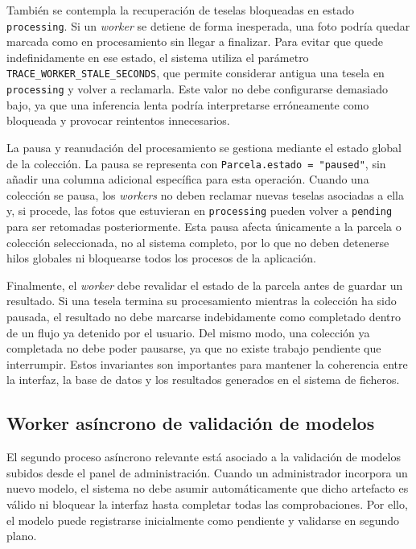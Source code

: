 También se contempla la recuperación de teselas bloqueadas en estado \texttt{processing}. Si un \textit{worker} se detiene de forma inesperada, una foto podría quedar marcada como en procesamiento sin llegar a finalizar. Para evitar que quede indefinidamente en ese estado, el sistema utiliza el parámetro \texttt{TRACE\_WORKER\_STALE\_SECONDS}, que permite considerar antigua una tesela en \texttt{processing} y volver a reclamarla. Este valor no debe configurarse demasiado bajo, ya que una inferencia lenta podría interpretarse erróneamente como bloqueada y provocar reintentos innecesarios.

La pausa y reanudación del procesamiento se gestiona mediante el estado global de la colección. La pausa se representa con \texttt{Parcela.estado = "paused"}, sin añadir una columna adicional específica para esta operación. Cuando una colección se pausa, los \textit{workers} no deben reclamar nuevas teselas asociadas a ella y, si procede, las fotos que estuvieran en \texttt{processing} pueden volver a \texttt{pending} para ser retomadas posteriormente. Esta pausa afecta únicamente a la parcela o colección seleccionada, no al sistema completo, por lo que no deben detenerse hilos globales ni bloquearse todos los procesos de la aplicación.

Finalmente, el \textit{worker} debe revalidar el estado de la parcela antes de guardar un resultado. Si una tesela termina su procesamiento mientras la colección ha sido pausada, el resultado no debe marcarse indebidamente como completado dentro de un flujo ya detenido por el usuario. Del mismo modo, una colección ya completada no debe poder pausarse, ya que no existe trabajo pendiente que interrumpir. Estos invariantes son importantes para mantener la coherencia entre la interfaz, la base de datos y los resultados generados en el sistema de ficheros.

\subsection{Worker asíncrono de validación de modelos}

El segundo proceso asíncrono relevante está asociado a la validación de modelos subidos desde el panel de administración. Cuando un administrador incorpora un nuevo modelo, el sistema no debe asumir automáticamente que dicho artefacto es válido ni bloquear la interfaz hasta completar todas las comprobaciones. Por ello, el modelo puede registrarse inicialmente como pendiente y validarse en segundo plano.


